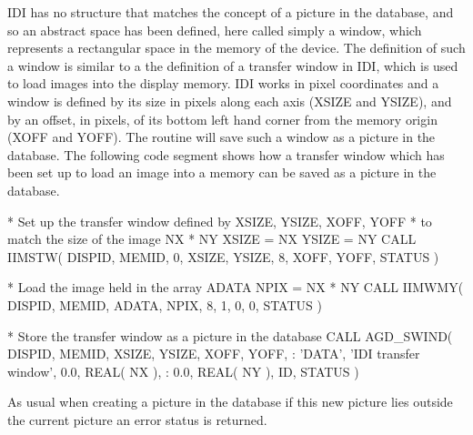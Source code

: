 \documentclass[twoside,11pt]{starlink}
\begin{document}
IDI has no structure that matches the concept of a picture in the database,
and so an abstract space has been defined, here called simply a window, which
represents a rectangular space in the memory of the device. The definition
of such a window is similar to a the definition of a transfer window in IDI,
which is used to load images into the display memory.
IDI works in pixel coordinates and a window is defined by its size in
pixels along each axis (XSIZE and YSIZE), and by an offset, in pixels,
of its bottom left hand corner from the memory origin (XOFF and YOFF).
The routine 
will save such a window as a picture in the
database. The following code segment shows how a transfer window which has
been set up to load an image into a memory can be saved as a picture in the
database.
\begin{terminalv}
    *   Set up the transfer window defined by XSIZE, YSIZE, XOFF, YOFF
    *   to match the size of the image NX * NY
          XSIZE = NX
          YSIZE = NY
          CALL IIMSTW( DISPID, MEMID, 0, XSIZE, YSIZE, 8, XOFF, YOFF, STATUS )

    *   Load the image held in the array ADATA
          NPIX = NX * NY
          CALL IIMWMY( DISPID, MEMID, ADATA, NPIX, 8, 1, 0, 0, STATUS )

    *   Store the transfer window as a picture in the database
          CALL AGD_SWIND( DISPID, MEMID, XSIZE, YSIZE, XOFF, YOFF,
         :                'DATA', 'IDI transfer window', 0.0, REAL( NX ),
         :                 0.0, REAL( NY ), ID, STATUS )
\end{terminalv}
As usual when creating a picture in the database if this new picture lies
outside the current picture an error status is returned.
\end{document}
